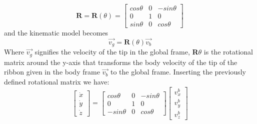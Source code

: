 \begin{equation}
    \textbf{R} = \textbf{R}(\theta) = \begin{bmatrix}
        cos \theta   &   0   &   -sin \theta \\
        0            &   1   &   0\\
        sin \theta   &   0   &   cos \theta
    \end{bmatrix}
\end{equation}
and the kinematic model becomes
\begin{equation}
    \vec{v_g} = \textbf{R}(\theta) \vec{v_b}
\end{equation}
Where $\vec{v_g}$ signifies the velocity of the tip in the global frame, \textbf{R}$\theta$ is the rotational matrix around the y-axis that transforms the body velocity of the tip of the ribbon given in the body frame $\vec{v_b}$ to the global frame. Inserting the previously defined rotational matrix we have:
\begin{equation}
    \begin{bmatrix}
        \dot{x}\\ \dot{y}\\ \dot{z}
    \end{bmatrix} = 
    \begin{bmatrix}
        cos \theta   &   0   &   -sin \theta \\
        0            &   1   &   0\\
       -sin \theta   &   0   &   cos \theta
    \end{bmatrix}
    \begin{bmatrix}
        v_x^b \\ v_y^b \\ v_z^b
    \end{bmatrix}
\end{equation}

